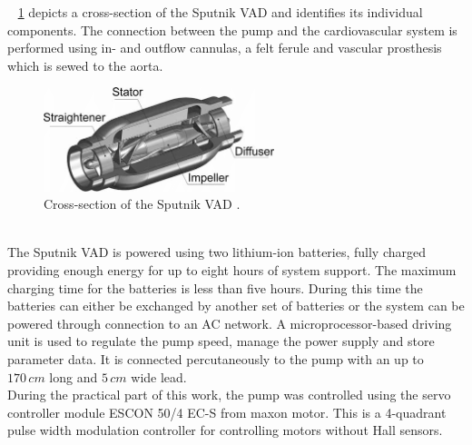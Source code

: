 \figurename~ \ref{fig:sput_cross} depicts a cross-section of the Sputnik VAD and identifies its individual components.
The connection between the pump and the cardiovascular system is performed using in- and outflow cannulas, a felt ferule and vascular prosthesis which is sewed to the aorta. \cite{Sputnik1}
\begin{figure}[ht]
  \centering
  \includegraphics[width=0.6\textwidth]{images/chapt_4/sputnik_cross.png}
  \caption[Cross-section of Sputnik VAD \cite{Sputnik6}]{Cross-section of the Sputnik VAD \cite{Sputnik6}.}
  \label{fig:sput_cross}
\end{figure}
\\The Sputnik VAD is powered using two lithium-ion batteries, fully charged providing enough energy for up to eight hours of system support. The maximum charging time for the batteries is less than five hours. During this time the batteries can either be exchanged by another set of batteries or the system can be powered through connection to an AC network. A microprocessor-based driving unit is used to regulate the pump speed, manage the power supply and store parameter data. It is connected percutaneously to the pump with an up to $170\, cm$ long and $5\, cm$ wide lead. \cite{Sputnik1}
\\During the practical part of this work, the pump was controlled using the servo controller module ESCON 50/4 EC-S from maxon motor. This is a 4-quadrant pulse width modulation controller for controlling motors without Hall sensors.

